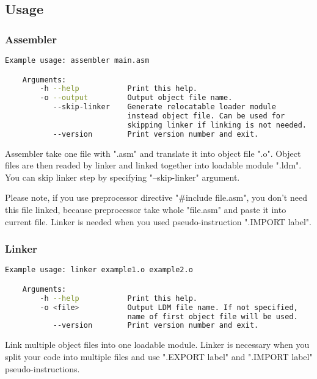 \subsection{Usage}

\subsubsection{Assembler}

\begin{lstlisting}[language=bash, frame=single]
    Example usage: assembler main.asm

    Arguments:
        -h --help           Print this help.
        -o --output         Output object file name.
           --skip-linker    Generate relocatable loader module
                            instead object file. Can be used for
                            skipping linker if linking is not needed.
           --version        Print version number and exit.
\end{lstlisting}

Assembler take one file with ".asm" and translate it into object file ".o".
Object files are then readed by linker and linked together into loadable module
".ldm". You can skip linker step by specifying "--skip-linker" argument.

Please note, if you use preprocessor directive "\#include file.asm", you don't
need this file linked, because preprocessor take whole "file.asm" and paste it
into current file. Linker is needed when you used pseudo-instruction ".IMPORT
label".

\subsubsection{Linker}

\begin{lstlisting}[language=bash, frame=single]
    Example usage: linker example1.o example2.o

    Arguments:
        -h --help           Print this help.
        -o <file>           Output LDM file name. If not specified,
                            name of first object file will be used.
           --version        Print version number and exit.
\end{lstlisting}

Link multiple object files into one loadable module. Linker is necessary when
you split your code into multiple files and use ".EXPORT label" and ".IMPORT
label" pseudo-instructions.

